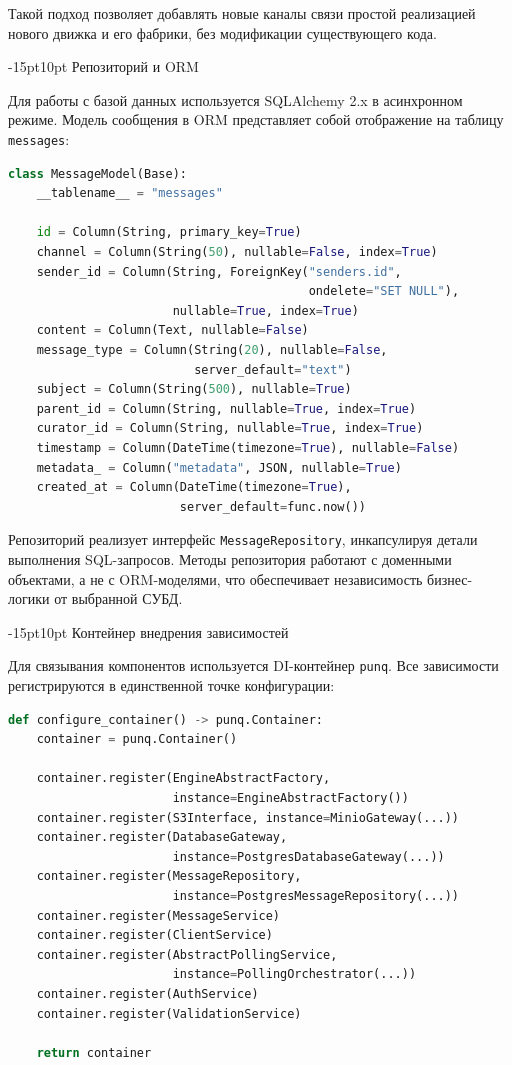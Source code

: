 \documentclass[12pt,a4paper]{report}
\makeatletter
\renewcommand{\section}{%
  \@startsection{section}{1}{\z@}%
  {-15pt}{10pt}%
  {\centering\normalfont\bfseries\large}}
\makeatother
\begin{document}
Такой подход позволяет добавлять новые каналы связи простой реализацией нового движка и его фабрики, без модификации существующего кода.

\section{Репозиторий и ORM}

Для работы с базой данных используется SQLAlchemy 2.x в асинхронном режиме. Модель сообщения в ORM представляет собой отображение на таблицу \texttt{messages}:

\begin{lstlisting}[language=Python]
class MessageModel(Base):
    __tablename__ = "messages"

    id = Column(String, primary_key=True)
    channel = Column(String(50), nullable=False, index=True)
    sender_id = Column(String, ForeignKey("senders.id",
                                          ondelete="SET NULL"),
                       nullable=True, index=True)
    content = Column(Text, nullable=False)
    message_type = Column(String(20), nullable=False,
                          server_default="text")
    subject = Column(String(500), nullable=True)
    parent_id = Column(String, nullable=True, index=True)
    curator_id = Column(String, nullable=True, index=True)
    timestamp = Column(DateTime(timezone=True), nullable=False)
    metadata_ = Column("metadata", JSON, nullable=True)
    created_at = Column(DateTime(timezone=True),
                        server_default=func.now())
\end{lstlisting}

Репозиторий реализует интерфейс \texttt{MessageRepository}, инкапсулируя детали выполнения SQL-запросов. Методы репозитория работают с доменными объектами, а не с ORM-моделями, что обеспечивает независимость бизнес-логики от выбранной СУБД.

\section{Контейнер внедрения зависимостей}

Для связывания компонентов используется DI-контейнер \texttt{punq}. Все зависимости регистрируются в единственной точке конфигурации:

\begin{lstlisting}[language=Python]
def configure_container() -> punq.Container:
    container = punq.Container()

    container.register(EngineAbstractFactory,
                       instance=EngineAbstractFactory())
    container.register(S3Interface, instance=MinioGateway(...))
    container.register(DatabaseGateway,
                       instance=PostgresDatabaseGateway(...))
    container.register(MessageRepository,
                       instance=PostgresMessageRepository(...))
    container.register(MessageService)
    container.register(ClientService)
    container.register(AbstractPollingService,
                       instance=PollingOrchestrator(...))
    container.register(AuthService)
    container.register(ValidationService)

    return container
\end{lstlisting}
\end{document}
